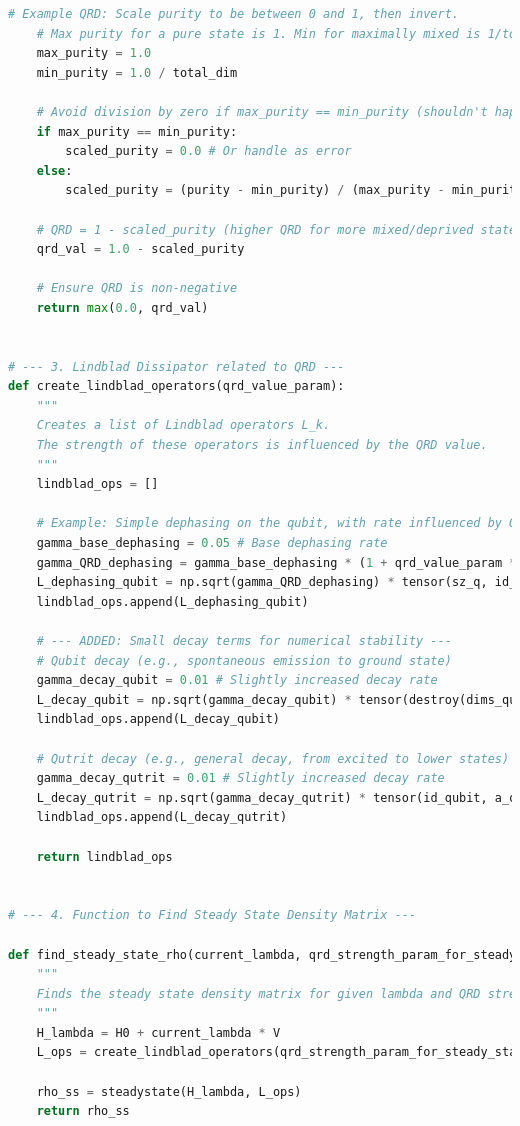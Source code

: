 \documentclass[9pt]{article}
\begin{document}
\begin{lstlisting}[language=Python, basicstyle=\ttfamily\footnotesize, breaklines=true, frame=single, caption={Python Code for Stability Analysis of Quantum Subsystem}, label={lst:qrd_code}]
    # Example QRD: Scale purity to be between 0 and 1, then invert.
    # Max purity for a pure state is 1. Min for maximally mixed is 1/total_dim.
    max_purity = 1.0
    min_purity = 1.0 / total_dim

    # Avoid division by zero if max_purity == min_purity (shouldn't happen for total_dim > 1)
    if max_purity == min_purity:
        scaled_purity = 0.0 # Or handle as error
    else:
        scaled_purity = (purity - min_purity) / (max_purity - min_purity)

    # QRD = 1 - scaled_purity (higher QRD for more mixed/deprived states)
    qrd_val = 1.0 - scaled_purity

    # Ensure QRD is non-negative
    return max(0.0, qrd_val)


# --- 3. Lindblad Dissipator related to QRD ---
def create_lindblad_operators(qrd_value_param):
    """
    Creates a list of Lindblad operators L_k.
    The strength of these operators is influenced by the QRD value.
    """
    lindblad_ops = []

    # Example: Simple dephasing on the qubit, with rate influenced by QRD
    gamma_base_dephasing = 0.05 # Base dephasing rate
    gamma_QRD_dephasing = gamma_base_dephasing * (1 + qrd_value_param * 2.0)
    L_dephasing_qubit = np.sqrt(gamma_QRD_dephasing) * tensor(sz_q, id_qutrit)
    lindblad_ops.append(L_dephasing_qubit)

    # --- ADDED: Small decay terms for numerical stability ---
    # Qubit decay (e.g., spontaneous emission to ground state)
    gamma_decay_qubit = 0.01 # Slightly increased decay rate
    L_decay_qubit = np.sqrt(gamma_decay_qubit) * tensor(destroy(dims_qubit), id_qutrit)
    lindblad_ops.append(L_decay_qubit)

    # Qutrit decay (e.g., general decay, from excited to lower states)
    gamma_decay_qutrit = 0.01 # Slightly increased decay rate
    L_decay_qutrit = np.sqrt(gamma_decay_qutrit) * tensor(id_qubit, a_qt)
    lindblad_ops.append(L_decay_qutrit)

    return lindblad_ops


# --- 4. Function to Find Steady State Density Matrix ---

def find_steady_state_rho(current_lambda, qrd_strength_param_for_steady_state):
    """
    Finds the steady state density matrix for given lambda and QRD strength.
    """
    H_lambda = H0 + current_lambda * V
    L_ops = create_lindblad_operators(qrd_strength_param_for_steady_state)
    
    rho_ss = steadystate(H_lambda, L_ops)
    return rho_ss



\end{lstlisting}
\end{document}
